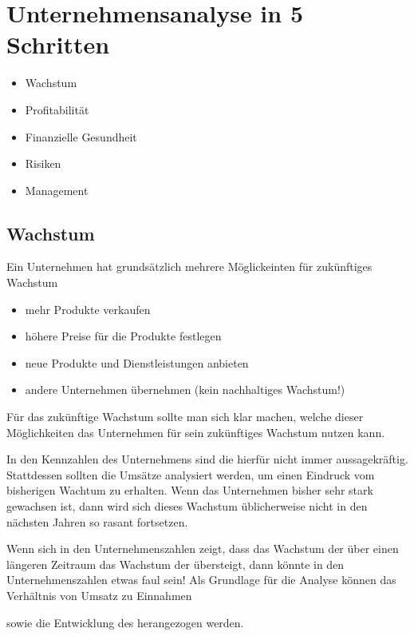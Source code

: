 

\chapter{Unternehmensanalyse in 5 Schritten}
\begin{itemize}
    \item Wachstum
    \item Profitabilität
    \item Finanzielle Gesundheit
    \item Risiken
    \item Management
\end{itemize}

\section{Wachstum}

Ein Unternehmen hat grundsätzlich mehrere Möglickeinten für zukünftiges Wachstum
\begin{itemize}
    \item mehr Produkte verkaufen
    \item höhere Preise für die Produkte festlegen
    \item neue Produkte und Dienstleistungen anbieten
    \item andere Unternehmen übernehmen (kein nachhaltiges Wachstum!)
\end{itemize}

Für das zukünftige Wachstum sollte man sich klar machen, welche dieser Möglichkeiten das Unternehmen für sein zukünftiges Wachstum nutzen kann.

In den Kennzahlen des Unternehmens sind die \earnings hierfür nicht immer aussagekräftig. 
Stattdessen sollten die Umsätze \sales analysiert werden, um einen Eindruck vom bisherigen Wachtum zu erhalten.
Wenn das Unternehmen bisher sehr stark gewachsen ist, dann wird sich dieses Wachstum üblicherweise nicht in den nächsten Jahren so rasant fortsetzen.

Wenn sich in den Unternehmenszahlen zeigt, dass das Wachstum der \earnings über einen längeren Zeitraum das Wachstum der \sales übersteigt, dann könnte in den Unternehmenszahlen etwas faul sein!
Als Grundlage für die Analyse können das Verhältnis von Umsatz zu Einnahmen
\begin{formel}
\end{formel}
sowie die Entwicklung des  herangezogen werden.

